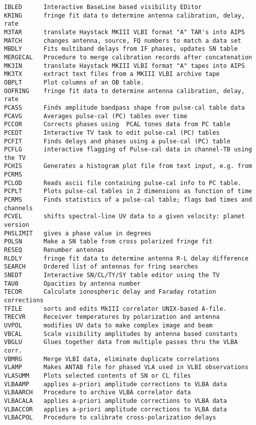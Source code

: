 \begin{verbatim}
IBLED      Interactive BaseLine based visibility EDitor
KRING      fringe fit data to determine antenna calibration, delay, rate
M3TAR      translate Haystack MKIII VLBI format "A" TAR's into AIPS
MATCH      changes antenna, source, FQ numbers to match a data set
MBDLY      Fits multiband delays from IF phases, updates SN table
MERGECAL   Procedure to merge calibration records after concatenation
MK3IN      translate Haystack MKIII VLBI format "A" tapes into AIPS
MK3TX      extract text files from a MKIII VLBI archive tape
OBPLT      Plot columns of an OB table.
OOFRING    fringe fit data to determine antenna calibration, delay, rate
PCASS      Finds amplitude bandpass shape from pulse-cal table data
PCAVG      Averages pulse-cal (PC) tables over time
PCCOR      Corrects phases using  PCAL tones data from PC table
PCEDT      Interactive TV task to edit pulse-cal (PC) tables
PCFIT      Finds delays and phases using a pulse-cal (PC) table
PCFLG      interactive flagging of Pulse-cal data in channel-TB using the TV
PCHIS      Generates a histogram plot file from text input, e.g. from PCRMS
PCLOD      Reads ascii file containing pulse-cal info to PC table.
PCPLT      Plots pulse-cal tables in 2 dimensions as function of time
PCRMS      Finds statistics of a pulse-cal table; flags bad times and channels
PCVEL      shifts spectral-line UV data to a given velocity: planet version
PHSLIMIT   gives a phase value in degrees
POLSN      Make a SN table from cross polarized fringe fit
RESEQ      Renumber antennas
RLDLY      fringe fit data to determine antenna R-L delay difference
SEARCH     Ordered list of antennas for fring searches
SNEDT      Interactive SN/CL/TY/SY table editor using the TV
TAU0       Opacities by antenna number
TECOR      Calculate ionospheric delay and Faraday rotation corrections
TFILE      sorts and edits MkIII correlator UNIX-based A-file.
TRECVR     Receiver temperatures by polarization and antenna
UVPOL      modifies UV data to make complex image and beam
VBCAL      Scale visibility amplitudes by antenna based constants
VBGLU      Glues together data from multiple passes thru the VLBA corr.
VBMRG      Merge VLBI data, eliminate duplicate correlations
VLAMP      Makes ANTAB file for phased VLA used in VLBI observations
VLASUMM    Plots selected contents of SN or CL files
VLBAAMP    applies a-priori amplitude corrections to VLBA data
VLBAARCH   Procedure to archive VLBA correlator data
VLBACALA   applies a-priori amplitude corrections to VLBA data
VLBACCOR   applies a-priori amplitude corrections to VLBA data
VLBACPOL   Procedure to calibrate cross-polarization delays

\end{verbatim}
